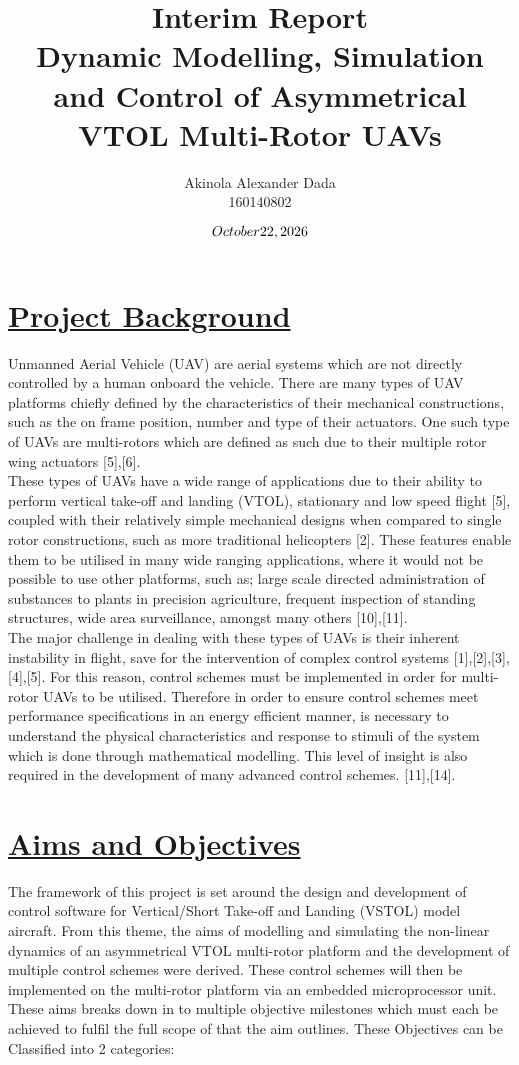 \documentclass[12pt,a4paper,twoside]{report}
\title{Interim Report \\ Dynamic Modelling, Simulation and Control of Asymmetrical VTOL Multi-Rotor UAVs}
\author{Akinola Alexander Dada \\ 160140802}
\date{$\today$}
\begin{document}
		
	\maketitle
	\newpage
	\section*{\underline{Project Background}}
	 
		Unmanned Aerial Vehicle (UAV) are aerial systems which are not directly controlled by a human onboard the vehicle. There are many types of UAV platforms chiefly defined by the characteristics of their mechanical constructions, such as the on frame position, number and type of their actuators. One such type of UAVs are multi-rotors which are defined as such due to their multiple rotor wing actuators [5],[6]. 
		\\
		These types of UAVs have a wide range of applications due to their ability to perform vertical take-off and landing (VTOL), stationary and low speed flight [5], coupled with their relatively simple mechanical designs when compared to single rotor constructions, such as more traditional helicopters [2]. These features enable them to be utilised in many wide ranging applications, where it would not be possible to use other platforms, such as; large scale directed administration of substances to plants in precision agriculture, frequent inspection of standing structures, wide area surveillance, amongst many others [10],[11].
		\\
		The major challenge in dealing with these types of UAVs is their inherent instability in flight, save for the intervention of complex control systems [1],[2],[3],[4],[5]. For this reason, control schemes must be implemented in order for multi-rotor UAVs to be utilised. Therefore in order to ensure control schemes meet performance specifications in an energy efficient manner, is necessary to understand the physical characteristics and response to stimuli of the system which is done through mathematical modelling. This level of insight is also required in the development of many advanced control schemes. [11],[14].
		
	\section*{\underline{Aims and Objectives}}
		
		The framework of this project is set around the design and development of control software for Vertical/Short Take-off and Landing (VSTOL) model aircraft. From this theme, the aims of modelling and simulating the non-linear dynamics of an asymmetrical VTOL multi-rotor platform and the development of multiple control schemes were derived. These control schemes will then be implemented on the multi-rotor platform via an embedded microprocessor unit. 
		\\
		These aims breaks down in to multiple objective milestones which must each be achieved to fulfil the full scope of that the aim outlines. These Objectives can be Classified into 2 categories:
\end{document}
